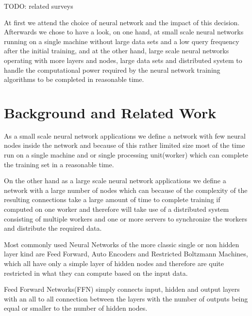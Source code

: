 \documentclass[conference]{IEEEtran}
\begin{document}
TODO: related surveys

 At first we attend the choice of neural network and the impact of this decision. Afterwards we chose to have a look, on one hand, at small scale neural networks running on a single machine without large data sets and a low query frequency after the initial training, and at the other hand, large scale neural networks operating with more layers and nodes, large data sets and distributed system to handle the computational power required by the neural network training algorithms to be completed in reasonable time.



\section{Background and Related Work}


As a small scale neural network applications we define a network with few neural nodes inside the network and because of this rather limited size most of the time run on a single machine and or single processing unit(worker) which can complete the training set in a reasonable time.



On the other hand as a large scale neural network applications we define a network with a large number of nodes which can because of the complexity of the resulting connections take a large amount of time to complete training if computed on one worker and therefore will take use of a distributed system consisting of multiple workers and one or more servers to synchronize the workers and distribute the required data.



Most commonly used Neural Networks of the more classic single or non hidden layer kind are Feed Forward, Auto Encoders and Restricted Boltzmann Machines, which all have only a simple layer of hidden nodes and therefore are quite restricted in what they can compute based on the input data. 

Feed Forward Networks(FFN) simply connects input, hidden and output layers with an all to all connection between the layers with the number of outputs being equal or smaller to the number of hidden nodes.
\end{document}

